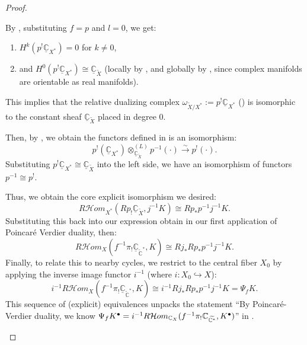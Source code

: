 \begin{proof}
\begin{enumerate}
              By \cite[Proposition~3.3.2(i)]{KashiwaraSchapira1994Sheaves}, substituting $f = p$ and $l = 0$, we get:
              \begin{enumerate}
                  \item $H^k(p^! \underline{\mathbb{C}}_{X^*}) = 0$ for $k \neq 0$,
                  \item and $H^0(p^! \underline{\mathbb{C}}_{X^*}) \cong \underline{\mathbb{C}}_{\widetilde{X}}$ (locally by \cite[Proposition~3.3.2]{KashiwaraSchapira1994Sheaves}, and globally by \cite[Proposition~3.3.6(iii)]{KashiwaraSchapira1994Sheaves}, since complex manifolds are orientable as real manifolds).
              \end{enumerate}
              This implies that the relative dualizing complex $\omega_{\widetilde{X}/X^*} := p^! \underline{\mathbb{C}}_{X^*}$ (\cite[Definition~3.1.16]{KashiwaraSchapira1994Sheaves}) is isomorphic to the constant sheaf $\underline{\mathbb{C}}_{\widetilde{X}}$ placed in degree 0.

              Then, by \cite[Proposition~3.3.2(ii)]{KashiwaraSchapira1994Sheaves}, we obtain the functors defined in \cite[Prop.~3.11]{KashiwaraSchapira1994Sheaves} is an isomorphism:
              \[
                  p^!(\underline{\mathbb{C}}_{X^*}) \otimes^{(L)}_{\underline{\mathbb{C}}_{\widetilde{X}}} p^{-1}(\cdot) \xrightarrow{\sim} p^!(\cdot).
              \]
              Substituting $p^! \underline{\mathbb{C}}_{X^*} \cong \underline{\mathbb{C}}_{\widetilde{X}}$ into the left side, we have an isomorphism of functors $p^{-1} \cong p^!$.

              Thus, we obtain the core explicit isomorphism we desired:
              \[
                  R\mathcal Hom_{X^*}\left(Rp_!\underline{\mathbb{C}}_{\widetilde{X}}, j^{-1}K\right) \cong Rp_* p^{-1} j^{-1}K.
              \]
              Substituting this back into our expression obtain in our first application of Poincar\'e Verdier duality, then:
              \[
                  R\mathcal Hom_X\left(f^{-1}\pi_!\underline{\mathbb{C}}_{\widetilde{\mathbb{C}}^*}, K\right) \cong Rj_* Rp_* p^{-1} j^{-1}K.
              \]
              Finally, to relate this to nearby cycles, we restrict to the central fiber $X_0$ by applying the inverse image functor $i^{-1}$ (where $i: X_0 \hookrightarrow X$):
              \[
                  i^{-1} R\mathcal Hom_X\left(f^{-1}\pi_!\underline{\mathbb{C}}_{\widetilde{\mathbb{C}}^*}, K\right) \cong i^{-1} Rj_* Rp_* p^{-1} j^{-1}K = \Psi_f K.
              \]
              This sequence of (explicit) equivalences unpacks the statement ``By Poincar\'e-Verdier duality, we know
              $\Psi_f{K^\bullet}=i^{-1}R\mathcal{H}om_{{\mathbb{C}_{X}}}(f^{-1}{\pi}_!\mathbb{C}_{\widetilde{\mathbb{C}^*}}, {K^\bullet})$'' in \cite[\S~3.1]{Wu2017NearbyVanishingCycles}.


\end{enumerate}
\end{proof}
